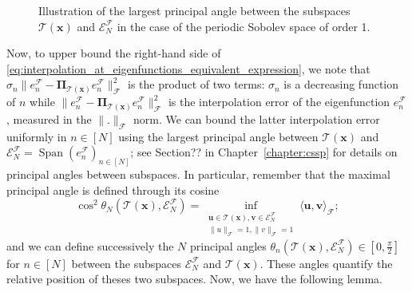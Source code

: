 \documentclass[twoside,11pt]{book}
\numberwithin{theorem}{chapter}
\numberwithin{definition}{chapter}
\numberwithin{proposition}{chapter}
\numberwithin{corollary}{chapter}
\numberwithin{example}{chapter}
\numberwithin{lemma}{chapter}
\DeclareMathOperator{\Span}{\mathrm{Span}}
\DeclareMathOperator{\F}{\mathcal{F}}
\newcommand{\rb}[1]{\textcolor{magenta}{#1}}
\begin{document}

\begin{figure}[]
\centering

 \caption{Illustration of the largest principal angle between the subspaces $\mathcal{T}(\bm{x})$ and $\mathcal{E}_{N}^{\mathcal{F}}$ in the case of the periodic Sobolev space of order 1.  \label{fig:func_principal_angles}}
\end{figure}


Now, to upper bound the right-hand side of \eqref{eq:interpolation_at_eigenfunctions_equivalent_expression}, we note that $\sigma_{n} \|e_{n}^{\F} - \bm{\Pi}_{\mathcal{T}(\bm{x})} e_{n}^{\F}\|_{\mathcal{F}}^{2}$ is the product of two terms: $\sigma_{n}$ is a decreasing function of $n$ while $\|e_{n}^{\F} - \bm{\Pi}_{\mathcal{T}(\bm{x})} e_{n}^{\F}\|_{\mathcal{F}}^{2}$ is the interpolation error of the eigenfunction $e_{n}^{\mathcal{F}}$, measured in the $\|.\|_{\mathcal{F}}$ norm.
We can bound the latter interpolation error uniformly in $n\in [N]$ using the largest principal angle between $\mathcal{T}(\bm{x})$ and $\mathcal{E}^{\mathcal{F}}_{N} = \Span(e_{n}^{\mathcal{F}})_{ n \in [N]}$; see Section?? in Chapter~\ref{chapter:cssp} for details on principal angles between subspaces. In particular, remember that the maximal principal angle is defined through its cosine
\begin{equation}
	\cos^{2} \theta_{N}(\mathcal{T}(\bm{x}),\mathcal{E}^{\mathcal{F}}_{N}) = \inf\limits_{\substack{\bm{u} \in \mathcal{T}(\bm{x}), \bm{v} \in \mathcal{E}^{\mathcal{F}}_{N}\\ \|u\|_{\mathcal{F}} = 1, \|v\|_{\mathcal{F}} = 1}} \langle \bm{u}, \bm{v} \rangle_{\mathcal{F}};
\end{equation}
and we can define successively the $N$ principal angles $\theta_{n}(\mathcal{T}(\bm{x}),\mathcal{E}^{\mathcal{F}}_{N}) \in \left[0, \frac{\pi}{2}\right]$ for $ n\in [N]$ between the subspaces $\mathcal{E}^{\mathcal{F}}_{N}$ and $\mathcal{T}(\bm{x})$. These angles quantify the relative position of theses two subspaces. Now, we have the following lemma.
\end{document}
